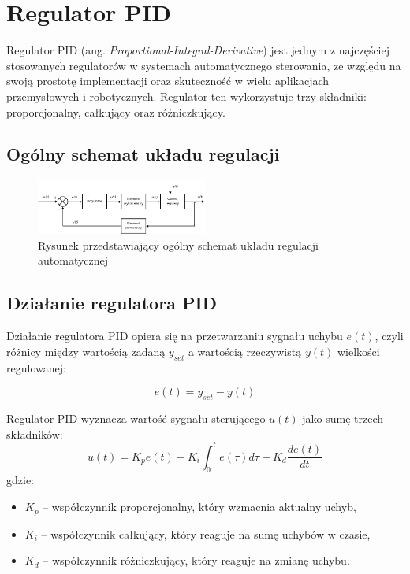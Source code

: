 \section{Regulator PID}

Regulator PID (ang. \textit{Proportional-Integral-Derivative}) jest jednym z najczęściej stosowanych regulatorów w systemach automatycznego sterowania, ze względu na swoją prostotę implementacji oraz skuteczność w wielu aplikacjach przemysłowych i robotycznych. Regulator ten wykorzystuje trzy składniki: proporcjonalny, całkujący oraz różniczkujący.

\subsection{Ogólny schemat układu regulacji}

\begin{figure}[h]
    \centering
    \includegraphics[width=0.5\textwidth]{./graf/regulacja1.png}
    \caption{Rysunek przedstawiający ogólny schemat układu regulacji automatycznej \cite{bib:wiki-regulacja}}
    \label{rys2:regulacja1}
\end{figure}

\subsection{Działanie regulatora PID}

Działanie regulatora PID opiera się na przetwarzaniu sygnału uchybu $e(t)$, czyli różnicy między wartością zadaną $y_{set}$ a wartością rzeczywistą $y(t)$ wielkości regulowanej:

\begin{equation}
e(t) = y_{set} - y(t)
\end{equation}

Regulator PID wyznacza wartość sygnału sterującego $u(t)$ jako sumę trzech składników:
\begin{equation}
u(t) = K_p e(t) + K_i \int_{0}^{t} e(\tau) d\tau + K_d \frac{de(t)}{dt}
\end{equation}
gdzie:
\begin{itemize}
    \item $K_p$ – współczynnik proporcjonalny, który wzmacnia aktualny uchyb,
    \item $K_i$ – współczynnik całkujący, który reaguje na sumę uchybów w czasie,
    \item $K_d$ – współczynnik różniczkujący, który reaguje na zmianę uchybu.
\end{itemize}

